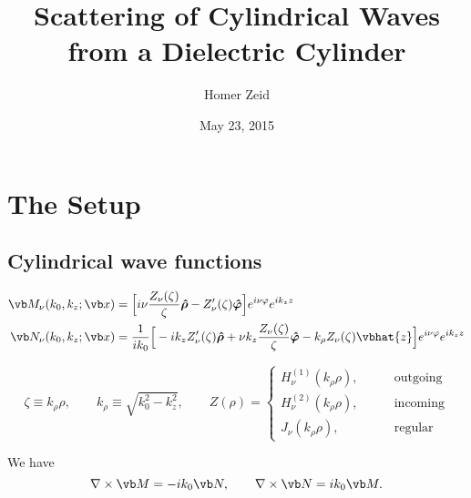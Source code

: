 \documentclass[letterpaper]{article}
\title {Scattering of Cylindrical Waves from a Dielectric Cylinder}
\author {Homer Zeid}
\date {May 23, 2015}
\newcommand{\vbhatt}[1]{\boldsymbol{\hat #1}}
\begin{document}
\pagestyle{myheadings}
\maketitle

\tableofcontents

\newpage
\section{The Setup}

\subsection{Cylindrical wave functions}

\begin{align*}
 \vb M_{\nu}(k_0, k_z; \vb x)
   &= \Big[   i\nu\frac{Z_\nu(\zeta)}{\zeta}\vbhatt{\rho} 
                  - Z_\nu^\prime(\zeta) \vbhatt{\varphi} 
      \Big]e^{i\nu\varphi} e^{ik_z z} 
\\
 \vb N_\nu(k_0, k_z; \vb x) 
&=\frac{1}{ik_0}
      \Big[ -ik_z Z_\nu^\prime(\zeta)          \vbhatt{\rho}
            +\nu k_z \frac{Z_\nu(\zeta)}{\zeta} \vbhatt{\varphi}
            - k_\rho Z_\nu(\zeta)\vbhat{z}
      \Big] e^{i\nu\varphi} e^{ik_z z} 
\end{align*}

$$ 
 \zeta \equiv k_\rho \rho,
 \qquad
 k_\rho\equiv \sqrt{k_0^2 - k_z^2},
 \qquad
 Z(\rho) =
 \begin{cases}
   H^{(1)}_\nu(k_\rho \rho), \qquad &\text{outgoing} \\
   H^{(2)}_\nu(k_\rho \rho), \qquad &\text{incoming} \\
   J_\nu      (k_\rho \rho), \qquad &\text{regular}
 \end{cases}
$$

We have 
$$ \nabla \times \vb M = -ik_0 \vb N, 
   \qquad 
   \nabla \times \vb N = ik_0 \vb M.
$$
\end{document}
